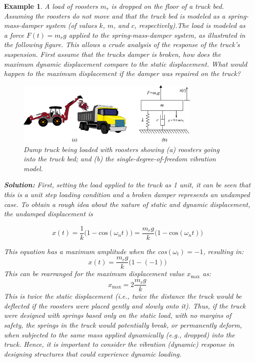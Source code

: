 \documentclass[12pt,letter]{article}
\newtheorem{ex}{Example}
\numberwithin{ex}{section} %
\newenvironment{example}{\begin{mdframed}[middlelinewidth=0.5mm]\begin{ex}\normalfont}{\end{ex}\end{mdframed}}
\numberwithin{re}{section} %
\begin{document}
\begin{example}
A load of roosters $m_r$ is dropped on the floor of a truck bed. Assuming the roosters do not move and that the truck bed is modeled as a spring-mass-damper system (of values $k$, $m$, and $c$, respectively).The load is modeled as a force $F(t) = m_r g$ applied to the spring-mass-damper system, as illustrated
in the following figure. This allows a crude analysis of the response of the truck's suspension. First assume that the trucks damper is broken, how does the maximum dynamic displacement compare to the static displacement. What would happen to the maximum displacement if the damper was repaired on the truck? %

\begin{figure}[H]
	\centering
	\includegraphics[width=0.8\textwidth]{../figures/dump_truck_example.png}
	\caption{Dump truck being loaded with roosters showing (a) roosters going into the truck bed; and (b) the single-degree-of-freedom vibration model.}
\end{figure}

\noindent\textbf{Solution:} First, setting the load applied to the truck as 1 unit, it can be seen that this is a unit step loading condition and a broken damper represents an undamped case. To obtain a rough idea about the nature of static and dynamic displacement, the undamped displacement is

\begin{equation}
	x(t) = \frac{1}{k}\big(1-\text{cos}(\omega_n t)\big) = \frac{m_rg}{k}\big(1-\text{cos}(\omega_n t)\big)
\end{equation}
 
This equation has a maximum amplitude when the cos$(\omega_t)=-1$, resulting in:
\begin{equation}
	x(t) = \frac{m_rg}{k}\big(1-(-1)\big)
\end{equation}
This can be rearranged for the maximum displacement value $x_\text{max} $ as:
\begin{equation}
	x_\text{max} = 2\frac{m_rg}{k}
\end{equation} 
This is twice the static displacement (i.e., twice the distance the truck would be deflected if the roosters were placed gently and slowly onto it). Thus, if the truck were designed with springs based only on the static load, with no margins of safety, the springs in the truck
would potentially break, or permanently deform, when subjected to the same mass applied dynamically (e.g., dropped) into the truck. Hence, it is important to consider the vibration (dynamic) response in designing structures that could experience dynamic loading.


\end{example}
\end{document}
